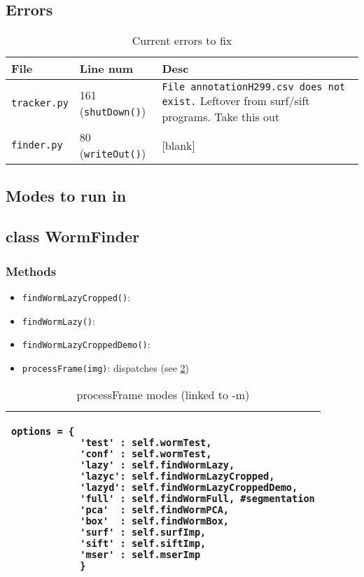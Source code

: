 \documentclass{article}
\begin{document}
\subsection{Errors}
\begin{table}[h]
\begin{tabular}{l | l | p{8cm} }
File & Line num & Desc\\ \hline
\verb|tracker.py| & 161 (\verb|shutDown()|) &\verb|File annotationH299.csv does not exist.| Leftover from surf/sift programs. Take this out\\
\verb|finder.py|  & 80 (\verb|writeOut()|) & [blank]\\ \hline
\end{tabular}
\caption{Current errors to fix}
\label{tab:errors}
\end{table}

\subsection{Modes to run in}

\subsection{class WormFinder}
\subsubsection{Methods}
\begin{itemize}
\item \verb|findWormLazyCropped()|: 
\item \verb|findWormLazy()|: 
\item \verb|findWormLazyCroppedDemo()|: 
\item \verb|processFrame(img)|: dispatches (see \ref{tab:options})
\end{itemize}


\begin{table}[h]
\begin{tabular}{|p{10cm}|}
\hline
\begin{verbatim} 
options = {
            'test' : self.wormTest,
            'conf' : self.wormTest,
            'lazy' : self.findWormLazy,
            'lazyc': self.findWormLazyCropped,
            'lazyd': self.findWormLazyCroppedDemo,
            'full' : self.findWormFull, #segmentation
            'pca'  : self.findWormPCA, 
            'box'  : self.findWormBox,
            'surf' : self.surfImp, 
            'sift' : self.siftImp,
            'mser' : self.mserImp
            }
\end{verbatim} \\
\hline
\end{tabular}
\caption{processFrame modes (linked to -m) }
\label{tab:options}
\end{table}


\end{document}
